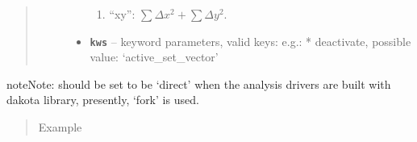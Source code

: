 \documentclass[letterpaper,10pt,english]{sphinxmanual}
\begin{document}
\begin{fulllineitems}
\begin{quote}
\begin{description}
\begin{itemize}
\begin{enumerate}
\item {} 
``xy'': \(\sum \Delta x^2 + \sum \Delta y^2\).

\end{enumerate}


\item {} 
\textbf{\texttt{kws}} -- keyword parameters, valid keys: 
e.g.:
* deactivate, possible value: `active\_set\_vector'

\end{itemize}

\end{description}\end{quote}

\begin{notice}{note}{Note:}
 should be set to be `direct' when the analysis drivers are
built with dakota library, presently, `fork' is used.
\end{notice}
\begin{quote}\begin{description}
\item[{Example}] \leavevmode
\end{description}\end{quote}


\end{fulllineitems}
\end{document}
